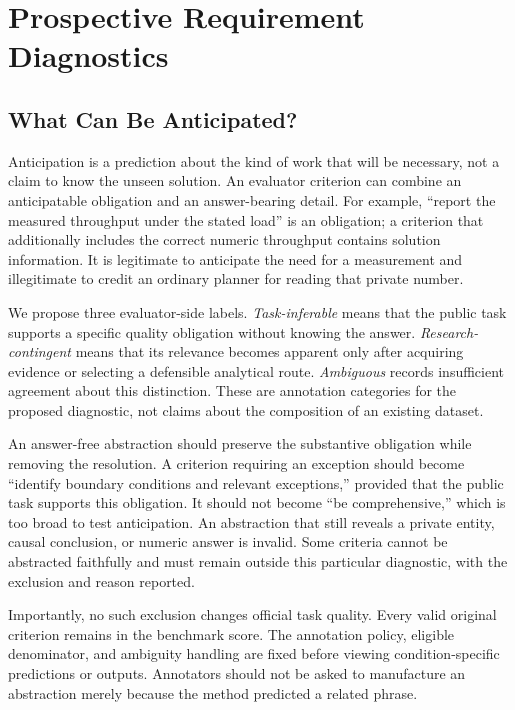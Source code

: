 \section{Prospective Requirement Diagnostics}
\label{app:prospective}

\subsection{What Can Be Anticipated?}

Anticipation is a prediction about the kind of work that will be necessary, not a claim to know the unseen solution. An evaluator criterion can combine an anticipatable obligation and an answer-bearing detail. For example, ``report the measured throughput under the stated load'' is an obligation; a criterion that additionally includes the correct numeric throughput contains solution information. It is legitimate to anticipate the need for a measurement and illegitimate to credit an ordinary planner for reading that private number.

We propose three evaluator-side labels. \emph{Task-inferable} means that the public task supports a specific quality obligation without knowing the answer. \emph{Research-contingent} means that its relevance becomes apparent only after acquiring evidence or selecting a defensible analytical route. \emph{Ambiguous} records insufficient agreement about this distinction. These are annotation categories for the proposed diagnostic, not claims about the composition of an existing dataset.

An answer-free abstraction should preserve the substantive obligation while removing the resolution. A criterion requiring an exception should become ``identify boundary conditions and relevant exceptions,'' provided that the public task supports this obligation. It should not become ``be comprehensive,'' which is too broad to test anticipation. An abstraction that still reveals a private entity, causal conclusion, or numeric answer is invalid. Some criteria cannot be abstracted faithfully and must remain outside this particular diagnostic, with the exclusion and reason reported.

Importantly, no such exclusion changes official task quality. Every valid original criterion remains in the benchmark score. The annotation policy, eligible denominator, and ambiguity handling are fixed before viewing condition-specific predictions or outputs. Annotators should not be asked to manufacture an abstraction merely because the method predicted a related phrase.

